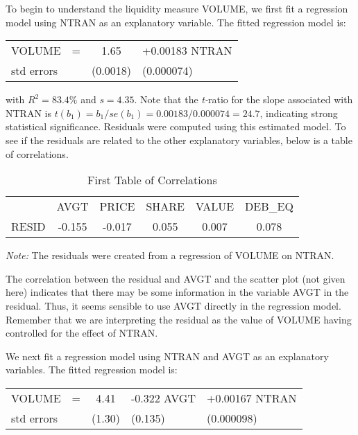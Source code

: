 To begin to understand the liquidity measure VOLUME, we first fit a
regression model using NTRAN as an explanatory variable. The fitted
regression model is:

\begin{center}
\begin{tabular}{lccl}
  VOLUME & = & 1.65 & +0.00183 NTRAN \\
  std errors &  & (0.0018)  & (0.000074) \\
\end{tabular}
\end{center}

\noindent with $R^{2}=83.4\%$ and $s=4.35$. Note that the
\textit{t-}ratio for the slope associated with NTRAN is
$t(b_{1})=b_{1}/se(b_{1})=0.00183/0.000074=24.7$, indicating strong
statistical significance. Residuals were computed using this
estimated model. To see if the residuals are related to the other
explanatory variables, below is a table of correlations.


\begin{table}[h]

\caption{\label{T5:LiquidResidCorr1} First Table of Correlations }
\begin{tabular}{cccccc}
 \hline
& AVGT & PRICE & SHARE & VALUE & DEB\_EQ \\
RESID & -0.155 & -0.017 & 0.055 & 0.007 & 0.078 \\ \hline
\end{tabular}

{\small \textit{Note:} The residuals were created from a regression
of VOLUME on NTRAN.} 
\end{table}

The correlation between the residual and AVGT and the scatter plot (not
given here) indicates that there may be some information in the variable
AVGT in the residual. Thus, it seems sensible to use AVGT directly in the
regression model. Remember that we are interpreting the residual as the
value of VOLUME having controlled for the effect of NTRAN.

We next fit a regression model using NTRAN and AVGT as an explanatory
variables. The fitted regression model is:

\begin{center}
\begin{tabular}{lccll}
  VOLUME     & = & 4.41   & -0.322 AVGT & +0.00167 NTRAN \\
  std errors &   & (1.30) & (0.135)     & (0.000098)     \\
\end{tabular}
\end{center}


